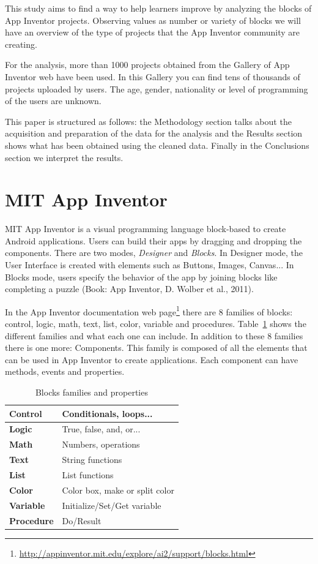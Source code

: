 \documentclass[a4paper]{article}
\begin{document}
This study aims to find a way to help learners improve by analyzing the blocks of App Inventor projects. Observing values as number or variety of blocks we will have an overview of the type of projects that the App Inventor community are creating.

For the analysis, more than 1000 projects obtained from the Gallery of App Inventor web have been used. 
In this Gallery you can find tens of thousands of projects uploaded by users. The age, gender, nationality or level of programming of the users are unknown.

This paper is structured as follows: the Methodology section talks about the acquisition and preparation of the data for the analysis and the Results section shows what has been obtained using the cleaned data. Finally in the Conclusions section we interpret the results.

\section{MIT App Inventor}

MIT App Inventor is a visual programming language block-based to create Android applications. Users can build their apps by dragging and dropping the components. There are two modes, \emph{Designer} and \emph{Blocks}. In Designer mode, the User Interface is created with elements such as Buttons, Images, Canvas... In Blocks mode, users specify the behavior of the app by joining blocks like completing a puzzle (Book: App Inventor, D. Wolber et al., 2011).

In the App Inventor documentation web page\footnote{\url{http://appinventor.mit.edu/explore/ai2/support/blocks.html}} there are 8 families of blocks: control, logic, math, text, list, color, variable and procedures. Table~\ref{tab:block-fam} shows the different families and what each one can include. In addition to these 8 families there is one more: Components. This family is composed of all the elements that can be used in App Inventor to create applications. Each component can have methods, events and properties.

\begin{table}
\begin{center}
\caption{Blocks families and properties}
\bigskip
\label{tab:block-fam}
\begin{tabular}{|l|l|}
\hline
\textbf{Control} & Conditionals, loops... \\ \hline
\textbf{Logic} & True, false, and, or... \\ \hline
\textbf{Math} & Numbers, operations\\ \hline
\textbf{Text} & String functions\\ \hline
\textbf{List} & List functions\\ \hline
\textbf{Color} & Color box, make or split color \\ \hline
\textbf{Variable} & Initialize/Set/Get variable\\ \hline
\textbf{Procedure} & Do/Result\\ \hline
\end{tabular}
\end{center}
\end{table}
\end{document}
